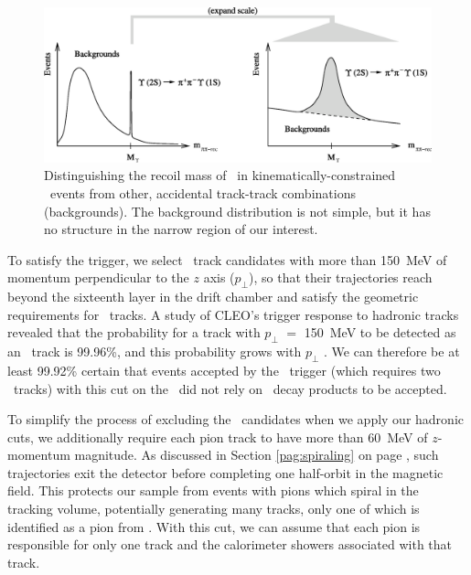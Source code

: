 \documentclass{cornell}
\begin{document}
\begin{figure}[t]
  \begin{center}
    \includegraphics[width=\linewidth]{cascadescartoon}
  \end{center}
  \caption[Identifying \twotoone\ events by \pipi\ recoil
  mass]{\label{cascadescartoon} Distinguishing the recoil mass of
  \pipi\ in kinematically-constrained \twotoone\ events from other,
  accidental track-track combinations (backgrounds).  The background
  distribution is not simple, but it has no structure in the narrow
  region of our interest.}
\end{figure}

To satisfy the trigger, we select \pipi\ track candidates with more
than 150~MeV of momentum perpendicular to the $z$ axis ($p_\perp$), so
that their trajectories reach beyond the sixteenth layer in the drift
chamber and satisfy the geometric requirements for \axial\ tracks.  A
study of CLEO's trigger response to hadronic tracks revealed that the
probability for a track with $p_\perp$ $=$ 150~MeV to be detected as
an \axial\ track is 99.96\%, and this probability grows with $p_\perp$
\cite{inga}.  We can therefore be at least 99.92\% certain that events
accepted by the \twotrack\ trigger (which requires two \axial\ tracks)
with this cut on the \pipi\ did not rely on \us\ decay products to be
accepted.

To simplify the process of excluding the \pipi\ candidates when we
apply our hadronic cuts, we additionally require each pion track to
have more than 60~MeV of $z$-momentum magnitude.  As discussed in
Section \ref{pag:spiraling} on page \pageref{pag:spiraling}, such
trajectories exit the detector before completing one half-orbit in the
magnetic field.  This protects our sample from events with pions which
spiral in the tracking volume, potentially generating many tracks,
only one of which is identified as a pion from \twotoone.  With this
cut, we can assume that each pion is responsible for only one track
and the calorimeter showers associated with that track.
\end{document}
